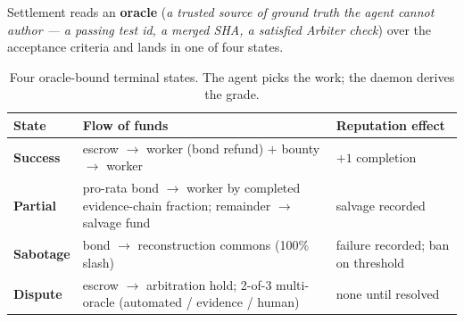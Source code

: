 \documentclass[11pt,a4paper]{article}
\theoremstyle{definition}
\theoremstyle{definition}
\theoremstyle{remark}
\begin{document}
Settlement reads an \textbf{oracle} (\emph{a trusted source of ground truth the
agent cannot author --- a passing test id, a merged SHA, a satisfied Arbiter
check}) over the acceptance criteria and lands in one of four states.

\begin{table}[H]
\centering
\small
\caption{Four oracle-bound terminal states. The agent picks the work; the daemon
derives the grade.}
\label{tab:settlement}
\begin{tabularx}{\textwidth}{@{}l >{\raggedright\arraybackslash}X >{\raggedright\arraybackslash}X@{}}
\toprule
\textbf{State} & \textbf{Flow of funds} & \textbf{Reputation effect} \\
\midrule
\textbf{Success}  & escrow $\to$ worker (bond refund) $+$ bounty $\to$ worker &
  $+1$ completion \\
\textbf{Partial}  & pro-rata bond $\to$ worker by completed evidence-chain
  fraction; remainder $\to$ salvage fund & salvage recorded \\
\textbf{Sabotage} & bond $\to$ reconstruction commons (100\% slash) &
  failure recorded; ban on threshold \\
\textbf{Dispute}  & escrow $\to$ arbitration hold; 2-of-3 multi-oracle
  (automated / evidence / human) & none until resolved \\
\bottomrule
\end{tabularx}
\end{table}
\end{document}
